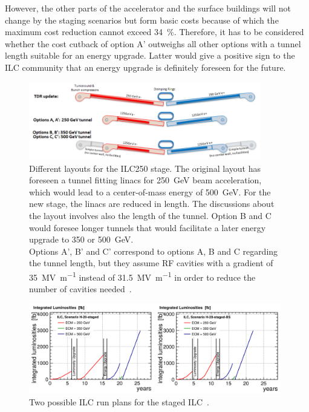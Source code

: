 However, the other parts of the accelerator and the surface buildings will not change by the staging scenarios but form basic costs because of which the maximum cost reduction cannot exceed \SI{34}{\percent}.
Therefore, it has to be considered whether the cost cutback of option A' outweighs all other options with a tunnel length suitable for an energy upgrade.
Latter would give a positive sign to the ILC community that an energy upgrade is definitely foreseen for the future.
\begin{figure}
\centering
\includegraphics[width=0.9\textwidth]{Figures/Staging.png}
\caption[Different layouts for the ILC250 stage]{Different layouts for the ILC250 stage.
The original layout has foreseen a tunnel fitting linacs for \SI{250}{\GeV} beam acceleration, which would lead to a center-of-mass energy of \SI{500}{\GeV}.
For the new stage, the linacs are reduced in length.
The discussions about the layout involves also the length of the tunnel.
Option B and C would foresee longer tunnels that would facilitate a later energy upgrade to 350 or \SI{500}{\GeV}.\\
Options A', B' and C' correspond to options A, B and C regarding the tunnel length, but they assume RF cavities with a gradient of \SI{35}{\mega\volt\per\meter} instead of \SI{31.5}{\mega\volt\per\meter} in order to reduce the number of cavities needed~\cite[p. 19]{Staging}.}
\label{fig:Staging}
\end{figure}
\begin{figure}[h]
\centering
\includegraphics[width=0.98\textwidth]{Figures/ILC_runningtime.png}
\caption[ILC run plan]{Two possible ILC run plans for the staged ILC~\cite[p. 8]{PhysicsCase}.}
\label{fig:ILC_runningtime}
\end{figure}
